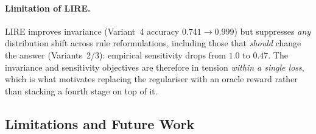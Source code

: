 \documentclass{article}
\begin{document}
\paragraph{Limitation of LIRE.}
LIRE improves invariance (Variant~4 accuracy $0.741 \to 0.999$) but suppresses \emph{any} distribution shift across rule reformulations, including those that \emph{should} change the answer (Variants~2/3): empirical sensitivity drops from $1.0$ to $0.47$. The invariance and sensitivity objectives are therefore in tension \emph{within a single loss}, which is what motivates replacing the regulariser with an oracle reward rather than stacking a fourth stage on top of it.



\subsection{Limitations and Future Work}
\label{app:limitations}
\end{document}
